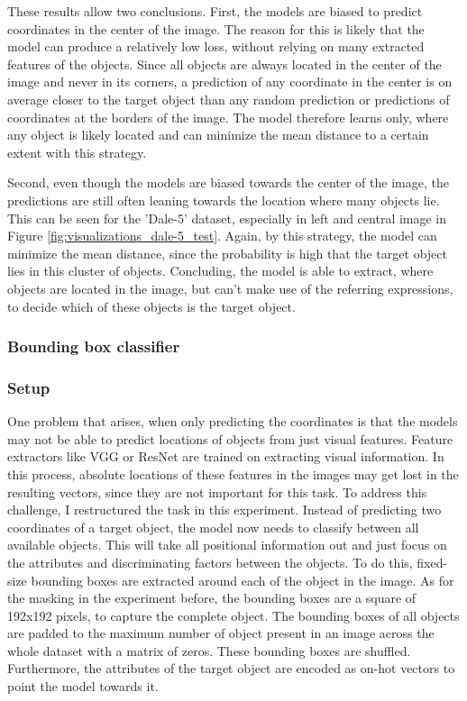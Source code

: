 These results allow two conclusions.
First, the models are biased to predict coordinates in the center of the image.
The reason for this is likely that the model can produce a relatively low loss, without relying on many extracted features of the objects.
Since all objects are always located in the center of the image and never in its corners, a prediction of any coordinate in the center is on average closer to the target object than any random prediction or predictions of coordinates at the borders of the image.
The model therefore learns only, where any object is likely located and can minimize the mean distance to a certain extent with this strategy.

Second, even though the models are biased towards the center of the image, the predictions are still often leaning towards the location where many objects lie.
This can be seen for the 'Dale-5' dataset, especially in left and central image in Figure \ref{fig:visualizations_dale-5_test}.
Again, by this strategy, the model can minimize the mean distance, since the probability is high that the target object lies in this cluster of objects.
Concluding, the model is able to extract, where objects are located in the image, but can't make use of the referring expressions, to decide which of these objects is the target object.

\subsubsection{Bounding box classifier}
\subsubsection*{Setup}

One problem that arises, when only predicting the coordinates is that the models may not be able to predict locations of objects from just visual features.
Feature extractors like VGG or ResNet are trained on extracting visual information.
In this process, absolute locations of these features in the images may get lost in the resulting vectors, since they are not important for this task.
To address this challenge, I restructured the task in this experiment.
Instead of predicting two coordinates of a target object, the model now needs to classify between all available objects.
This will take all positional information out and just focus on the attributes and discriminating factors between the objects.
To do this, fixed-size bounding boxes are extracted around each of the object in the image.
As for the masking in the experiment before, the bounding boxes are a square of 192x192 pixels, to capture the complete object. 
The bounding boxes of all objects are padded to the maximum number of object present in an image across the whole dataset with a matrix of zeros.
These bounding boxes are shuffled.
Furthermore, the attributes of the target object are encoded as on-hot vectors to point the model towards it.

